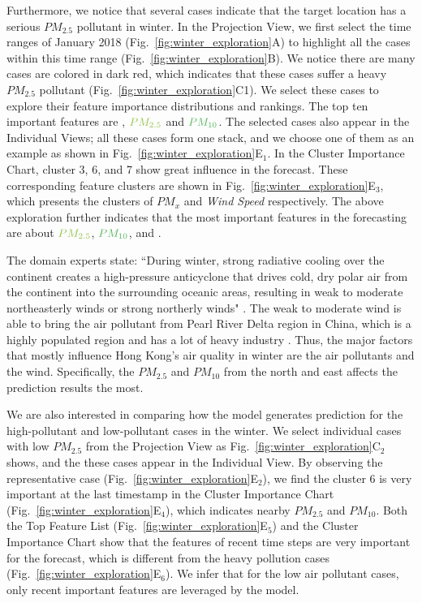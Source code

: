 Furthermore, we notice that several cases indicate that the target location has a serious $PM_{2.5}$ pollutant in winter. 
In the Projection View, we first select the time ranges of January 2018 (Fig.~\ref{fig:winter_exploration}A) to highlight all the cases within this time range (Fig.~\ref{fig:winter_exploration}B). 
We notice there are many cases are colored in dark red, which indicates that these cases suffer a heavy $PM_{2.5}$ pollutant (Fig.~\ref{fig:winter_exploration}C1).
We select these cases to explore their feature importance distributions and rankings.
The top ten important features are \textit{\color{WINDColor}{Wind Speed}}, $\color{PM25Color}{PM_{2.5}}$ and $\color{PM10Color}{PM_{10}}$.
The selected cases also appear in the Individual Views; all these cases form one stack, and we choose one of them as an example as shown in Fig.~\ref{fig:winter_exploration}E$_1$. 
In the Cluster Importance Chart, cluster 3, 6, and 7 show great influence in the forecast. 
These corresponding feature clusters are shown in Fig.~\ref{fig:winter_exploration}E$_3$, which presents the clusters of $PM_x$ and \textit{Wind Speed} respectively. 
The above exploration further indicates that the most important features in the forecasting are about $\color{PM25Color}{PM_{2.5}}$, $\color{PM10Color}{PM_{10}}$, and \textit{\color{WINDColor}{Wind Speed}}. 

The domain experts state: ``During winter, strong radiative cooling over the continent creates a high-pressure anticyclone that drives cold, dry polar air from the continent into the surrounding oceanic areas, resulting in weak to moderate northeasterly winds or strong northerly winds" \cite{louie2005seasonal, murakami1979winter}. 
The weak to moderate wind is able to bring the air pollutant from Pearl River Delta region in China, which is a highly populated region and has a lot of heavy industry \cite{cao2003characteristics}.
Thus, the major factors that mostly influence Hong Kong's air quality in winter are the air pollutants and the wind.
Specifically, the $PM_{2.5}$ and $PM_{10}$ from the north and east affects the prediction results the most. 

We are also interested in comparing how the model generates prediction for the high-pollutant and low-pollutant cases in the winter. 
We select individual cases with low $PM_{2.5}$ from the Projection View as Fig.~\ref{fig:winter_exploration}C$_2$ shows, and the these cases appear in the Individual View. 
By observing the representative case (Fig.~\ref{fig:winter_exploration}E$_2$), we find the cluster 6 is very important at the last timestamp in the Cluster Importance Chart (Fig.~\ref{fig:winter_exploration}E$_4$), which indicates nearby $PM_{2.5}$ and $PM_{10}$. 
Both the Top Feature List (Fig.~\ref{fig:winter_exploration}E$_5$) and the Cluster Importance Chart show that the features of recent time steps are very important for the forecast, which is different from the heavy pollution cases (Fig.~\ref{fig:winter_exploration}E$_6$). 
We infer that for the low air pollutant cases, only recent important features are leveraged by the model. 

